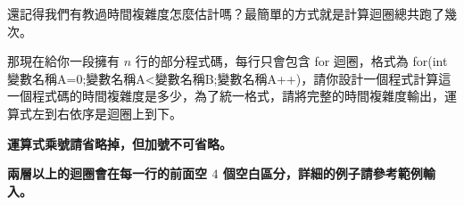 還記得我們有教過時間複雜度怎麼估計嗎？最簡單的方式就是計算迴圈總共跑了幾次。

那現在給你一段擁有 $n$ 行的部分程式碼，每行只會包含 for 迴圈，格式為 for(int 變數名稱A=0;變數名稱A<變數名稱B;變數名稱A++)，請你設計一個程式計算這一個程式碼的時間複雜度是多少，為了統一格式，請將完整的時間複雜度輸出，運算式左到右依序是迴圈上到下。

\textbf{運算式乘號請省略掉，但加號不可省略。}

\textbf{兩層以上的迴圈會在每一行的前面空 $4$ 個空白區分，詳細的例子請參考範例輸入。}
